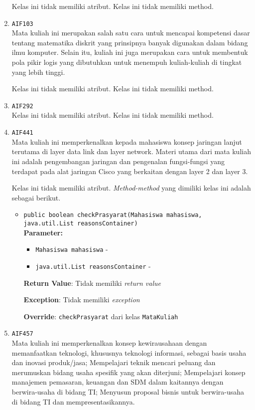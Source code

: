\documentclass{article}
\begin{document}
\begin{enumerate}
Kelas ini tidak memiliki atribut. Kelas ini tidak memiliki method. \item \texttt{AIF103}\\ 
Mata kuliah ini merupakan salah satu cara untuk mencapai kompetensi dasar 
 tentang matematika diskrit yang prinsipnya banyak digunakan dalam bidang 
 ilmu komputer. Selain itu, kuliah ini juga merupakan cara untuk membentuk 
 pola pikir logis yang dibutuhkan untuk menempuh kuliah-kuliah di tingkat 
 yang lebih tinggi.

Kelas ini tidak memiliki atribut. Kelas ini tidak memiliki method. \item \texttt{AIF292}\\ 


Kelas ini tidak memiliki atribut. Kelas ini tidak memiliki method. \item \texttt{AIF441}\\ 
Mata kuliah ini memperkenalkan kepada mahasiswa konsep jaringan lanjut
 terutama di layer data link dan layer network. Materi utama dari mata kuliah
 ini adalah pengembangan jaringan dan pengenalan fungsi-fungsi yang terdapat
 pada alat jaringan Cisco yang berkaitan dengan layer 2 dan layer 3.

Kelas ini tidak memiliki atribut. \textit{Method-method} yang dimiliki kelas ini adalah sebagai berikut.
\begin{itemize}
\item \texttt{public boolean checkPrasyarat(Mahasiswa mahasiswa, java.util.List reasonsContainer)}\\ 


\textbf{Parameter:}\begin{itemize}
\item \texttt{Mahasiswa mahasiswa} - 
\item \texttt{java.util.List reasonsContainer} - 
\end{itemize}
\textbf{Return Value}: Tidak memiliki \textit{return value}

\textbf{Exception}: Tidak memiliki \textit{exception}

\textbf{Override}: \texttt{checkPrasyarat} dari kelas \texttt{MataKuliah}

\end{itemize}
\item \texttt{AIF457}\\ 
Mata kuliah ini memperkenalkan konsep kewirausahaan dengan memanfaatkan teknologi, khususnya
 teknologi informasi, sebagai basis usaha dan inovasi produk/jasa; Mempelajari
 teknik mencari peluang dan merumuskan bidang usaha spesifik yang akan
 diterjuni; Mempelajari konsep manajemen pemasaran, keuangan dan SDM dalam
 kaitannya dengan berwira-usaha di bidang TI; Menyusun proposal bisnis untuk
 berwira-usaha di bidang TI dan mempresentasikannya.


\end{enumerate}
\end{document}
